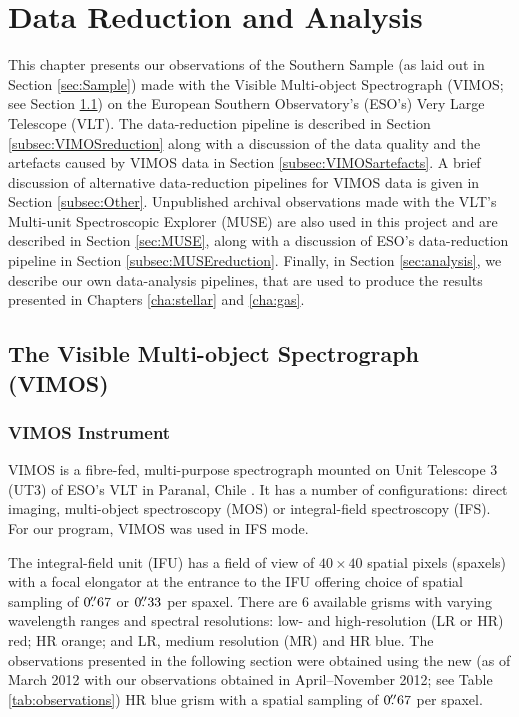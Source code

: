 \chapter{Data Reduction and Analysis}
	\label{cha:Data}
This chapter presents our observations of the Southern Sample (as laid out in Section \ref{sec:Sample}) made with the Visible Multi-object Spectrograph (VIMOS; see Section \ref{sec:VIMOS}) on the European Southern Observatory's (ESO's) Very Large Telescope (VLT). The data-reduction pipeline is described in Section \ref{subsec:VIMOSreduction} along with a discussion of the data quality and the artefacts caused by VIMOS data in Section \ref{subsec:VIMOSartefacts}. A brief discussion of alternative data-reduction pipelines for VIMOS data is given in Section \ref{subsec:Other}. Unpublished archival observations made with the VLT's Multi-unit Spectroscopic Explorer (MUSE) are also used in this project and are described in Section \ref{sec:MUSE}, along with a discussion of ESO's data-reduction pipeline in Section \ref{subsec:MUSEreduction}. Finally, in Section \ref{sec:analysis}, we describe our own data-analysis pipelines, that are used to produce the results presented in Chapters \ref{cha:stellar} and \ref{cha:gas}. 

\section[The Visible Multi-object Spectrograph (VIMOS)]{The Visible Multi-object Spectrograph \\(VIMOS)}
	\label{sec:VIMOS}
	\subsection{VIMOS Instrument}
		VIMOS is a fibre-fed, multi-purpose spectrograph mounted on Unit Telescope 3 (UT3) of ESO's VLT in Paranal, Chile \citep{LeFevre2003}. It has a number of configurations: direct imaging, multi-object spectroscopy (MOS) or integral-field spectroscopy (IFS). For our program, VIMOS was used in IFS mode. 

		The integral-field unit (IFU) has a field of view of $40 \times 40$ spatial pixels (spaxels) with a focal elongator at the entrance to the IFU offering choice of spatial sampling of $0 \hbox{$.\!\!^{\prime\prime}$}67$ or $0 \hbox{$.\!\!^{\prime\prime}$}33$ per spaxel. There are 6 available grisms with varying wavelength ranges and spectral resolutions: low- and high-resolution (LR or HR) red; HR orange; and LR, medium resolution (MR) and HR blue. The observations presented in the following section were obtained using the new (as of March 2012 with our observations obtained in April--November 2012; see Table \ref{tab:observations}) HR blue grism with a spatial sampling of $0 \hbox{$.\!\!^{\prime\prime}$}67$ per spaxel. 


